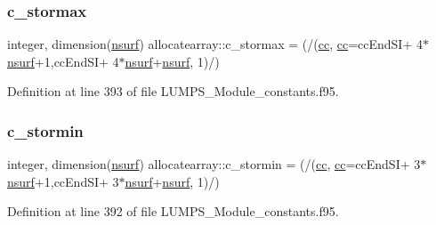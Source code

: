 \mbox{\label{namespaceallocatearray_aa6246aa1e26939ed7e752b7722b0be8c}} 
\subsubsection{\texorpdfstring{c\+\_\+stormax}{c\_stormax}}
{\footnotesize\ttfamily integer, dimension(\hyperlink{namespaceallocatearray_acd22f92a06f7e9a2a91426b3dc99fdb0}{nsurf}) allocatearray\+::c\+\_\+stormax = (/(\hyperlink{namespaceallocatearray_ac863c81704eb507dee10f5e10741e10c}{cc}, \hyperlink{namespaceallocatearray_ac863c81704eb507dee10f5e10741e10c}{cc}=cc\+End\+SI+ 4$\ast$\hyperlink{namespaceallocatearray_acd22f92a06f7e9a2a91426b3dc99fdb0}{nsurf}+1,cc\+End\+SI+ 4$\ast$\hyperlink{namespaceallocatearray_acd22f92a06f7e9a2a91426b3dc99fdb0}{nsurf}+\hyperlink{namespaceallocatearray_acd22f92a06f7e9a2a91426b3dc99fdb0}{nsurf}, 1)/)}



Definition at line 393 of file L\+U\+M\+P\+S\+\_\+\+Module\+\_\+constants.\+f95.

\mbox{\label{namespaceallocatearray_a56107e49d611ea80b3d07961c776361f}} 
\subsubsection{\texorpdfstring{c\+\_\+stormin}{c\_stormin}}
{\footnotesize\ttfamily integer, dimension(\hyperlink{namespaceallocatearray_acd22f92a06f7e9a2a91426b3dc99fdb0}{nsurf}) allocatearray\+::c\+\_\+stormin = (/(\hyperlink{namespaceallocatearray_ac863c81704eb507dee10f5e10741e10c}{cc}, \hyperlink{namespaceallocatearray_ac863c81704eb507dee10f5e10741e10c}{cc}=cc\+End\+SI+ 3$\ast$\hyperlink{namespaceallocatearray_acd22f92a06f7e9a2a91426b3dc99fdb0}{nsurf}+1,cc\+End\+SI+ 3$\ast$\hyperlink{namespaceallocatearray_acd22f92a06f7e9a2a91426b3dc99fdb0}{nsurf}+\hyperlink{namespaceallocatearray_acd22f92a06f7e9a2a91426b3dc99fdb0}{nsurf}, 1)/)}



Definition at line 392 of file L\+U\+M\+P\+S\+\_\+\+Module\+\_\+constants.\+f95.

\mbox{\label{namespaceallocatearray_a19301e431885ac6ef6524c2bf4e0829c}} 
